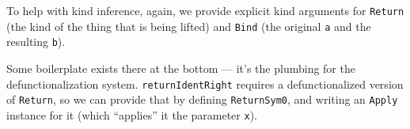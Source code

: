\documentclass[]{article}
\newenvironment{Shaded}{}{}
\newcommand{\DataTypeTok}[1]{\textcolor[rgb]{0.56,0.13,0.00}{#1}}
\newcommand{\FunctionTok}[1]{\textcolor[rgb]{0.02,0.16,0.49}{#1}}
\newcommand{\KeywordTok}[1]{\textcolor[rgb]{0.00,0.44,0.13}{\textbf{#1}}}
\newcommand{\NormalTok}[1]{#1}
\newcommand{\OperatorTok}[1]{\textcolor[rgb]{0.40,0.40,0.40}{#1}}
\newcommand{\OtherTok}[1]{\textcolor[rgb]{0.00,0.44,0.13}{#1}}
\begin{document}
\begin{Shaded}
\end{Shaded}

To help with kind inference, again, we provide explicit kind arguments for
\texttt{Return} (the kind of the thing that is being lifted) and \texttt{Bind}
(the original \texttt{a} and the resulting \texttt{b}).

Some boilerplate exists there at the bottom --- it's the plumbing for the
defunctionalization system. \texttt{returnIdentRight} requires a
defunctionalized version of \texttt{Return}, so we can provide that by defining
\texttt{ReturnSym0}, and writing an \texttt{Apply} instance for it (which
``applies'' it the parameter \texttt{x}).
\end{document}
